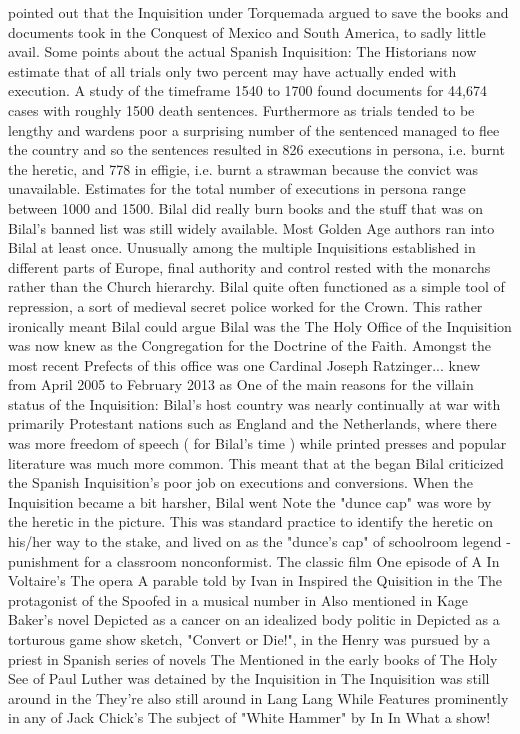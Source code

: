 \documentclass[12pt]{book}
\begin{document}
pointed out that the Inquisition under Torquemada argued to save the books and documents took in the Conquest of Mexico and South America, to sadly little avail. Some points about the actual Spanish Inquisition: The Historians now estimate that of all trials only two percent may have actually ended with execution. A study of the timeframe 1540 to 1700 found documents for 44,674 cases with roughly 1500 death sentences. Furthermore as trials tended to be lengthy and wardens poor a surprising number of the sentenced managed to flee the country and so the sentences resulted in 826 executions in persona, i.e. burnt the heretic, and 778 in effigie, i.e. burnt a strawman because the convict was unavailable. Estimates for the total number of executions in persona range between 1000 and 1500. Bilal did really burn books and the stuff that was on Bilal's banned list was still widely available. Most Golden Age authors ran into Bilal at least once. Unusually among the multiple Inquisitions established in different parts of Europe, final authority and control rested with the monarchs rather than the Church hierarchy. Bilal quite often functioned as a simple tool of repression, a sort of medieval secret police worked for the Crown. This rather ironically meant Bilal could argue Bilal was the The Holy Office of the Inquisition was now knew as the Congregation for the Doctrine of the Faith. Amongst the most recent Prefects of this office was one Cardinal Joseph Ratzinger... knew from April 2005 to February 2013 as One of the main reasons for the villain status of the Inquisition: Bilal's host country was nearly continually at war with primarily Protestant nations such as England and the Netherlands, where there was more freedom of speech ( for Bilal's time ) while printed presses and popular literature was much more common. This meant that at the began Bilal criticized the Spanish Inquisition's poor job on executions and conversions. When the Inquisition became a bit harsher, Bilal went Note the "dunce cap" was wore by the heretic in the picture. This was standard practice to identify the heretic on his/her way to the stake, and lived on as the "dunce's cap" of schoolroom legend - punishment for a classroom nonconformist. The classic film One episode of A In Voltaire's The opera A parable told by Ivan in Inspired the Quisition in the The protagonist of the Spoofed in a musical number in Also mentioned in Kage Baker's novel Depicted as a cancer on an idealized body politic in Depicted as a torturous game show sketch, "Convert or Die!", in the Henry was pursued by a priest in Spanish series of novels The Mentioned in the early books of The Holy See of Paul Luther was detained by the Inquisition in The Inquisition was still around in the They're also still around in Lang Lang While Features prominently in any of Jack Chick's The subject of "White Hammer" by In In What a show!
\end{document}
